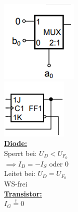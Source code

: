 \documentclass[8pt]{extarticle}
\begin{document}
\newpage

\begin{minipage}{0.33\textwidth}
\vspace{-1cm}
\includegraphics[scale=0.40]{Mult.png}\\
\includegraphics[scale=0.40]{FF.png}\\

\underline{\textbf{Diode:}}\\
Sperrt bei: $U_D < U_{F_0}$\\
\phantom{sssi}$\implies I_D = -I_S$ oder $0$\\
Leitet bei: $U_D = U_{F_0}$\\
WS-frei \\

\underline{\textbf{Transistor:}}\\
$I_G \stackrel{!}{=} 0$\\


\end{minipage}
\end{document}
